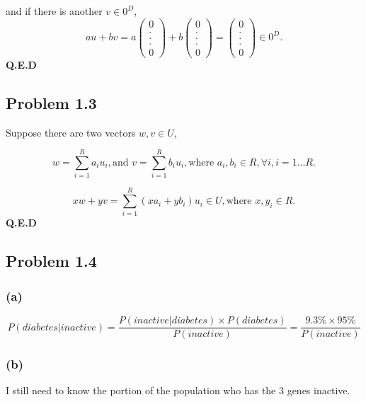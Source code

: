 \documentclass{article}
\begin{document}
and if there is another $v \in 0^D$,
	\begin{equation*}
		au + bv = a \begin{pmatrix} 0 \\ . \\ . \\ . \\ 0 \end{pmatrix} + b \begin{pmatrix} 0 \\ . \\ . \\ . \\ 0 \end{pmatrix}  =  \begin{pmatrix} 0 \\ . \\ . \\ . \\ 0 \end{pmatrix} \in 0^D.
	\end{equation*}
	\textbf{Q.E.D}

\subsection*{Problem 1.3}
	Suppose there are two vectors $w,v \in U$,
	
	 \begin{equation*}
    		w= \sum_{i=1}^{R} a_iu_i, \text{and  } v= \sum_{i=1}^{R} b_iu_i, \text{where } a_i,b_i\in R,\forall i, i = 1...R.
	\end{equation*}
	
	 \begin{equation*}
    		xw + yv= \sum_{i=1}^{R}(xa_i+yb_i)u_i \in U, \text{where } x,y_i\in R.
	\end{equation*}
\textbf{Q.E.D}

\subsection*{Problem 1.4}
\subsubsection*{(a)}
	\begin{equation*}
		P(diabetes | inactive) = \frac{P(inactive|diabetes)\times P(diabetes)}{P(inactive)} =  \frac{9.3\% \times 95\%}{P(inactive)}
	\end{equation*}

\subsubsection*{(b)}
	I still need to know the portion of the population who has the 3 genes inactive.
\end{document}

